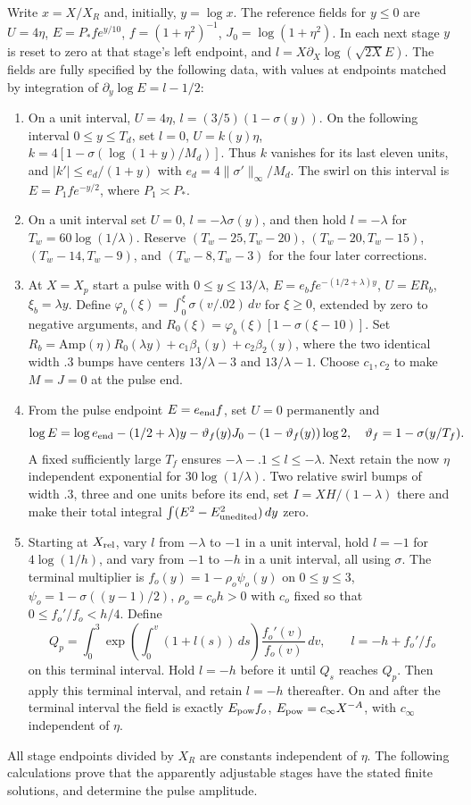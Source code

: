 \documentclass[10pt,a4paper]{article}
\begin{document}
Write $x=X/X_R$ and, initially, $y=\log x$. The reference fields for $y\le0$
are $U=4\eta$, $E=P_*f e^{y/10}$, $f=(1+\eta^2)^{-1}$,
$J_0=\log(1+\eta^2)$. In each next stage $y$ is reset to zero at that
stage's left endpoint, and $l=X\partial_X\log(\sqrt{2X}E)$.
The fields are fully specified by the following data, with values at endpoints
matched by integration of $\partial_y\log E=l-1/2$:
\begin{enumerate}
\item On a unit interval, $U=4\eta$, $l=(3/5)(1-\sigma(y))$.
On the following interval $0\le y\le T_d$, set $l=0$,
$U=k(y)\eta$, $k=4[1-\sigma(\log(1+y)/M_d)]$.
Thus $k$ vanishes for its last eleven units, and
$|k'|\le e_d/(1+y)$ with $e_d=4\|\sigma'\|_\infty/M_d$.
The swirl on this interval is $E=P_1fe^{-y/2}$, where $P_1\asymp P_*$.
\item On a unit interval set $U=0$, $l=-\lambda\sigma(y)$, and then
hold $l=-\lambda$ for $T_w=60\log(1/\lambda)$.
Reserve $(T_w-25,T_w-20)$, $(T_w-20,T_w-15)$,
$(T_w-14,T_w-9)$, and $(T_w-8,T_w-3)$ for the four later corrections.
\item At $X=X_p$ start a pulse with $0\le y\le13/\lambda$,
$E=e_bf e^{-(1/2+\lambda)y}$, $U=ER_b$, $\xi_b=\lambda y$.
Define $\varphi_b(\xi)=\int_0^\xi\sigma(v/.02)\,dv$ for $\xi\ge0$,
extended by zero to negative arguments, and
$R_0(\xi)=\varphi_b(\xi)[1-\sigma(\xi-10)]$.
Set $R_b=\mathrm{Amp}(\eta)R_0(\lambda y)+c_1\beta_1(y)+c_2\beta_2(y)$,
where the two identical width $.3$ bumps have centers $13/\lambda-3$ and
$13/\lambda-1$. Choose $c_1,c_2$ to make $M=J=0$ at the pulse end.
\item From the pulse endpoint $E=e_{\rm end}f$, set $U=0$ permanently and
\[
\log E=\log e_{\rm end}-(1/2+\lambda)y
-\vartheta_f(y)J_0-(1-\vartheta_f(y))\log2,
\quad\vartheta_f=1-\sigma(y/T_f).
\]
A fixed sufficiently large $T_f$ ensures $-\lambda-.1\le l\le-\lambda$.
Next retain the now $\eta$ independent exponential for $30\log(1/\lambda)$.
Two relative swirl bumps of width $.3$, three and one units before its end,
set $I=XH/(1-\lambda)$ there and make their total integral
$\int(E^2-E_{\rm unedited}^2)\,dy$ zero.
\item Starting at $X_{\rm rel}$, vary $l$ from $-\lambda$ to $-1$ in a
unit interval, hold $l=-1$ for $4\log(1/h)$, and vary from $-1$ to $-h$
in a unit interval, all using $\sigma$.
The terminal multiplier is
$f_o(y)=1-\rho_o\psi_o(y)$ on $0\le y\le3$,
$\psi_o=1-\sigma((y-1)/2)$, $\rho_o=c_oh>0$ with $c_o$ fixed so that
$0\le f_o'/f_o<h/4$.
Define
\[
Q_p=\int_0^3\exp\left(\int_0^v(1+l(s))\,ds\right)
\frac{f_o'(v)}{f_o(v)}\,dv,\qquad l=-h+f_o'/f_o
\]
on this terminal interval. Hold $l=-h$ before it until $Q_s$ reaches $Q_p$.
Then apply this terminal interval, and retain $l=-h$ thereafter.
On and after the terminal interval the field is exactly $E_{\rm pow}f_o$,
$E_{\rm pow}=c_\infty X^{-A}$, with $c_\infty$ independent of $\eta$.
\end{enumerate}
All stage endpoints divided by $X_R$ are constants independent of $\eta$.
The following calculations prove that the apparently adjustable stages have
the stated finite solutions, and determine the pulse amplitude.
\end{document}
